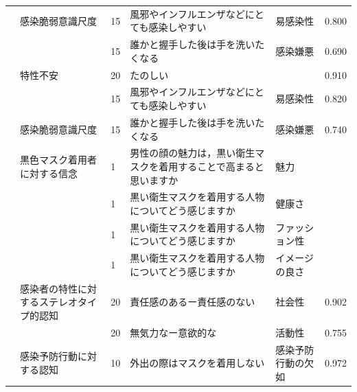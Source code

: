 \begin{landscape}
\begin{longtable}{p{2cm}p{2cm}p{2cm}p{6cm}p{2cm}p{2cm}}
                                 & 感染脆弱意識尺度                         & 15  & 風邪やインフルエンザなどにとても感染しやすい                              & 易感染性                 & 0.800   \\
                                 &                                  & 15  & 誰かと握手した後は手を洗いたくなる                                   & 感染嫌悪                 & 0.690   \\
                                 & 特性不安                             & 20  & たのしい                                                &                      & 0.910   \\
                                 &                                  & 15  & 風邪やインフルエンザなどにとても感染しやすい                              & 易感染性                 & 0.820   \\
                                 & 感染脆弱意識尺度                         & 15  & 誰かと握手した後は手を洗いたくなる                                   & 感染嫌悪                 & 0.740   \\
        \citet{Kamatani202192}   & 黒色マスク着用者に対する信念                   & 1   & 男性の顔の魅力は，黒い衛生マスクを着用することで高まると思いますか                   & 魅力                   &         \\
                                 &                                  & 1   & 黒い衛生マスクを着用する人物についてどう感じますか                           & 健康さ                  &         \\
                                 &                                  & 1   & 黒い衛生マスクを着用する人物についてどう感じますか                           & ファッション性              &         \\
                                 &                                  & 1   & 黒い衛生マスクを着用する人物についてどう感じますか                           & イメージの良さ              &         \\
        \citet{Yamamoto202192}   & 感染者の特性に対するステレオタイプ的認知             & 20  & 責任感のあるー責任感のない                                       & 社会性                  & 0.902   \\
                                 &                                  & 20  & 無気力なー意欲的な                                           & 活動性                  & 0.755   \\
                                 & 感染予防行動に対する認知                     & 10  & 外出の際はマスクを着用しない                                      & 感染予防行動の欠如            & 0.972   \\

\end{longtable}
\end{landscape}
